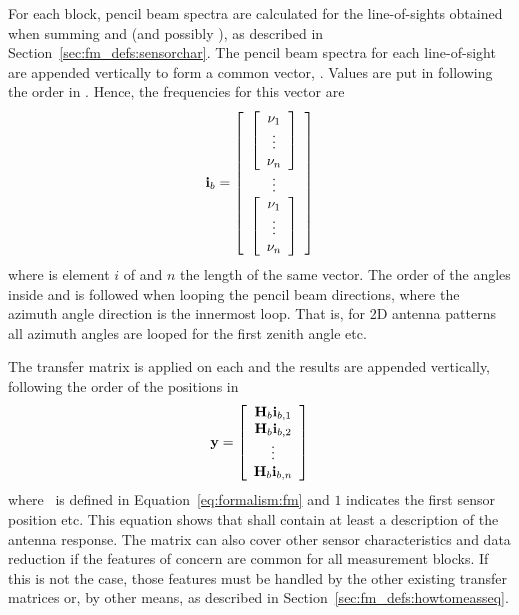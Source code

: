 For each block, pencil beam spectra are calculated for the
line-of-sights obtained when summing  and
 (and possibly
), as described in
Section~\ref{sec:fm_defs:sensorchar}. The pencil beam spectra for each
line-of-sight are appended vertically to form a common vector,
. Values are put in following the order in
. Hence, the frequencies for this vector are
\begin{equation}
  \mathbf{i}_{b} = 
  \left[ \begin{array}{c} 
     \left[
          \begin{array}{c} \nu_{1}\\\vdots\\\nu_{n} \end{array} 
     \right] \\
     \vdots \\
     \left[
          \begin{array}{c} \nu_{1}\\\vdots\\\nu_{n} \end{array} 
     \right]
     \end{array} \right]
  \label{eq:fm_defs:freqs_of_ib}
\end{equation}
where  is element $i$ of  and $n$ the length of
the same vector. The order of the angles inside 
and  is followed when looping the pencil beam
directions, where the azimuth angle direction is the innermost loop.
That is, for 2D antenna patterns all azimuth angles are looped for the
first zenith angle etc. 

The transfer matrix  is applied on each  and the
results are appended vertically, following the order of the positions
in 
\begin{equation}
  \mathbf{y} = \left[ \begin{array}{c} \mathbf{H}_{b}\mathbf{i}_{{b,1}} \\ 
                                    \mathbf{H}_{b}\mathbf{i}_{{b,2}} \\
                                    \vdots                     \\
                                    \mathbf{H}_{b}\mathbf{i}_{{b,n}} 
            \end{array} \right]
  \label{eq:fm_defs:measseq}
\end{equation}
where \MsrVct\ is defined in Equation~\ref{eq:formalism:fm} and $1$
indicates the first sensor position etc. This equation shows that
 shall contain at least a description of the antenna
response. The matrix  can also cover other sensor
characteristics and data reduction if the features of concern are
common for all measurement blocks. If this is not the case, those
features must be handled by the other existing transfer matrices or, by
other means, as described in Section~\ref{sec:fm_defs:howtomeasseq}.

